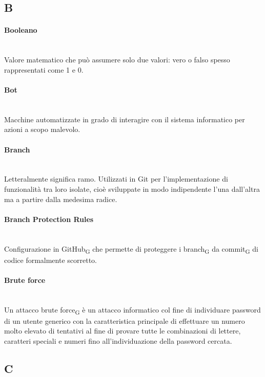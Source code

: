 \subsection*{B}
\paragraph{Booleano}~\smallskip \\
Valore matematico che può assumere solo due valori: vero o falso spesso rappresentati come 1 e 0.

\paragraph{Bot}~\smallskip \\
Macchine automatizzate in grado di interagire con il sistema informatico per azioni a scopo malevolo.

\paragraph{Branch}~\smallskip \\
Letteralmente significa ramo. Utilizzati in Git per l'implementazione di funzionalità tra loro isolate, cioè sviluppate in modo indipendente l'una dall'altra ma a partire dalla medesima radice.

\paragraph{Branch Protection Rules}~\smallskip \\
Configurazione in GitHub\textsubscript{G} che permette di proteggere i branch\textsubscript{G} da commit\textsubscript{G} di codice formalmente scorretto.

\paragraph{Brute force}~\smallskip \\
Un attacco brute force\textsubscript{G} è un attacco informatico col fine di individuare password di un utente generico con la caratteristica principale di effettuare un numero molto elevato di tentativi al fine di provare tutte le combinazioni di lettere, caratteri speciali e numeri fino all'individuazione della password cercata.
\newpage
{}
\subsection*{C}
